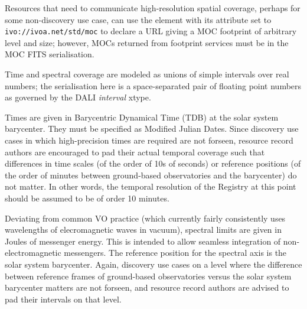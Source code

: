 \documentclass[11pt,a4paper]{ivoa}
\begin{document}
Resources that need to communicate high-resolution spatial coverage,
perhaps for some non-discovery use case, can use the 
element with its  attribute set to
\nolinkurl{ivo://ivoa.net/std/moc} to declare a URL giving a MOC 
footprint of arbitrary level and size; however, MOCs returned from
footprint services must be in the MOC FITS serialisation.

Time and spectral coverage are modeled as unions of simple
intervals over real numbers; the serialisation here is a space-separated
pair of floating point numbers as governed by the DALI \emph{interval}
xtype.

Times are given in Barycentric Dynamical Time (TDB) at the solar system
barycenter.  They must be specified as Modified Julian Dates.  Since
discovery use cases in which high-precision times are required are not
forseen, resource record authors are encouraged to pad their actual
temporal coverage such that differences in time scales (of the order of
10s of seconds) or reference positions (of the order of minutes between
ground-based observatories and the barycenter) do not matter.  In other
words, the temporal resolution of the Registry at this point should be
assumed to be of order 10 minutes.

Deviating from common VO practice (which currently fairly consistently
uses wavelengths of elecromagnetic waves in vacuum), spectral limits are
given in Joules of messenger energy.  This is intended to allow seamless
integration of non-electromagnetic messengers.  The reference position
for the spectral axis is the solar system barycenter.  Again, discovery
use cases on a level where the difference between reference frames of
ground-based observatories versus the solar system barycenter matters
are not forseen, and resource record authors are advised to pad their
intervals on that level.
\end{document}
